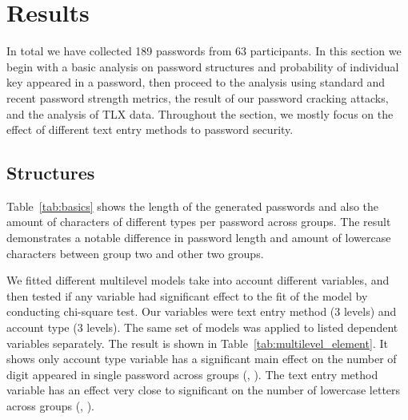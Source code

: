 \documentclass[conference]{IEEEtran}
\begin{document}
\section{Results}

In total we have collected 189 passwords from 63 participants. In this section we begin with a basic analysis on password structures and probability of individual key appeared in a password, then proceed to the analysis using standard and recent password strength metrics, the result of our password cracking attacks, and the analysis of TLX data. Throughout the section, we mostly focus on the effect of different text entry methods to password security.

\subsection{Structures}

Table~\ref{tab:basics} shows the length of the generated passwords and also the amount of characters of different types per password across groups. The result demonstrates a notable difference in password length and amount of lowercase characters between group two and other two groups.




\begin{table}[tbph]
\begin{center}
  \caption{The mean of password length, amount of characters of different types per password across groups.}
    \label{tab:basics}
\end{center}
\end{table}

We fitted different multilevel models take into account different variables, and then tested if any variable had significant effect to the fit of the model by conducting chi-square test. Our variables were text entry method (3 levels) and account type (3 levels). The same set of models was applied to listed dependent variables separately. The result is shown in Table~\ref{tab:multilevel_element}. It shows only account type variable has a significant main effect on the number of digit appeared in single password across groups (, ). The text entry method variable has an effect very close to significant on the number of lowercase letters across groups (, ). 
\end{document}
